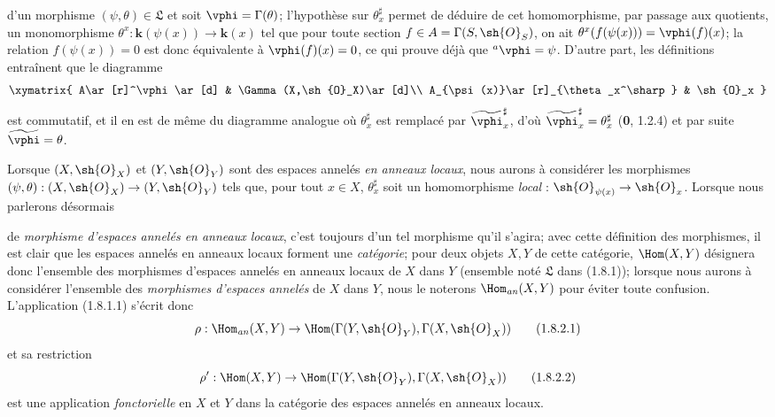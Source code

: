 d'un morphisme $(\psi,\theta)\in\mathfrak L$ et soit
$\vphi=\Gamma(\theta)$; l'hypothèse sur $\theta_x^\sharp$ permet de
déduire de cet homomorphisme, par passage aux quotients, un
monomorphisme
$\theta^x:\boldsymbol{k}(\psi(x))\to\boldsymbol{k}(x)$
tel que pour toute section $f\in A=\Gamma(S,\sh{O}_S)$, on ait
$\theta^x(f(\psi(x)))=\vphi(f)(x)$; la relation $f(\psi(x))=0$ est donc
équivalente à $\vphi(f)(x)=0$, ce qui prouve déjà que
${}^a\vphi=\psi$. D'autre part, les définitions entraînent que le
diagramme
\[
  \xymatrix{
    A\ar[r]^\vphi\ar[d] &
    \Gamma(X,\sh{O}_X)\ar[d]\\
    A_{\psi(x)}\ar[r]_{\theta_x^\sharp} &
    \sh{O}_x
  }
\]
est commutatif, et il en est de même du diagramme analogue où
$\theta_x^\sharp$ est remplacé par
$\widetilde{\vphi}_x^\sharp$, d'où
$\widetilde{\vphi}_x^\sharp=\theta_x^\sharp$ (\textbf{0}, 1.2.4) et par suite
$\widetilde{\vphi}=\theta$.

\begin{env}[1.8.2]
\label{ega2:addendum:I.1.8.2-fr}
Lorsque $(X,\sh{O}_X)$ et $(Y,\sh{O}_Y)$ sont des espaces annelés \emph{en
anneaux locaux}, nous aurons à considérer les morphismes
$(\psi,\theta):(X,\sh{O}_X)\to(Y,\sh{O}_Y)$ tels que, pour tout
$x\in X$, $\theta_x^\sharp$ soit un homomorphisme \emph{local} :
$\sh{O}_{\psi(x)}\to\sh{O}_x$.
Lorsque nous parlerons désormais
de \emph{morphisme d'espaces annelés
en anneaux locaux}, c'est toujours d'un tel morphisme qu'il s'agira;
avec cette définition des morphismes, il est clair que les espaces
annelés en anneaux locaux forment une \emph{catégorie}; pour deux objets
$X,Y$ de cette catégorie, $\Hom(X,Y)$ désignera donc l'ensemble des
morphismes d'espaces annelés en anneaux locaux de $X$ dans $Y$
(ensemble noté $\mathfrak L$ dans (1.8.1)); lorsque nous aurons à
considérer l'ensemble des \emph{morphismes d'espaces annelés} de $X$ dans
$Y$, nous le noterons $\Hom_{\mathit{an}}(X,Y)$ pour éviter toute
confusion. L'application (1.8.1.1) s'écrit donc
\begin{equation}
\label{ega2:addendum:I.1.8.2.1-fr}
  \rho:\Hom_{\mathit{an}}(X,Y)
  \to\Hom(\Gamma(Y,\sh{O}_Y),\Gamma(X,\sh{O}_X))
\tag{1.8.2.1}
\end{equation}
et sa restriction
\begin{equation}
\label{ega2:addendum:I.1.8.2.2-fr}
  \rho':\Hom(X,Y)
  \to\Hom(\Gamma(Y,\sh{O}_Y),\Gamma(X,\sh{O}_X))
\tag{1.8.2.2}
\end{equation}
est une application \emph{fonctorielle} en $X$ et $Y$ dans la catégorie des
espaces annelés en anneaux locaux.
\end{env}

